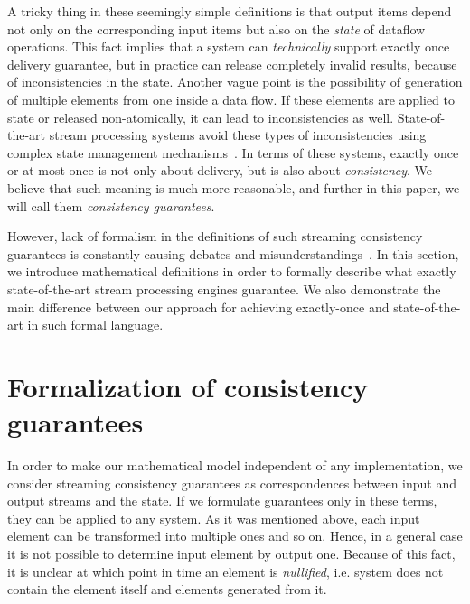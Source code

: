 \documentclass[sigconf]{acmart}
\theoremstyle{remark}
\begin{document}
A tricky thing in these seemingly simple definitions is that output items depend not only on the corresponding input items but also on the {\em state} of dataflow operations. This fact implies that a system can {\em technically} support exactly once delivery guarantee, but in practice can release completely invalid results, because of inconsistencies in the state. Another vague point is the possibility of generation of multiple elements from one inside a data flow. If these elements are applied to state or released non-atomically, it can lead to inconsistencies as well. State-of-the-art stream processing systems avoid these types of inconsistencies using complex state management mechanisms~\cite{Carbone:2017:SMA:3137765.3137777}. In terms of these systems, exactly once or at most once is not only about delivery, but is also about {\em consistency}. We believe that such meaning is much more reasonable, and further in this paper, we will call them {\em consistency guarantees}.   

However, lack of formalism in the definitions of such streaming consistency guarantees is constantly causing debates and misunderstandings~\cite{JerryPengStreamIO, PaperTrail}. In this section, we introduce mathematical definitions in order to formally describe what exactly state-of-the-art stream processing engines guarantee. We also demonstrate the main difference between our approach for achieving exactly-once and state-of-the-art in such formal language.     

\section{Formalization of consistency guarantees}

In order to make our mathematical model independent of any implementation, we consider streaming consistency guarantees as correspondences between input and output streams and the state. If we formulate guarantees only in these terms, they can be applied to any system. As it was mentioned above, each input element can be transformed into multiple ones and so on. Hence, in a general case it is not possible to determine input element by output one. Because of this fact, it is unclear at which point in time an element is {\em nullified}, i.e. system does not contain the element itself and elements generated from it.  
\end{document}
